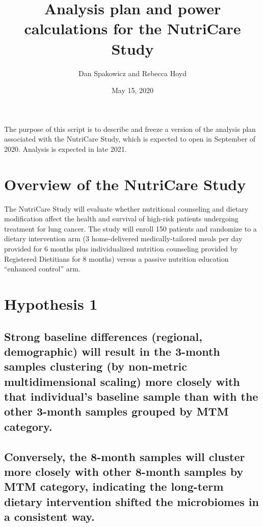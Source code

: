 \documentclass[]{article}
\title{Analysis plan and power calculations for the NutriCare Study}
\author{Dan Spakowicz and Rebecca Hoyd}
\date{May 15, 2020}
\begin{document}
\maketitle

The purpose of this script is to describe and freeze a version of the
analysis plan associated with the NutriCare Study, which is expected to
open in September of 2020. Analysis is expected in late 2021.

\hypertarget{overview-of-the-nutricare-study}{%
\section{Overview of the NutriCare
Study}\label{overview-of-the-nutricare-study}}

The NutriCare Study will evaluate whether nutritional counseling and
dietary modification affect the health and survival of high-risk
patients undergoing treatment for lung cancer. The study will enroll 150
patients and randomize to a dietary intervention arm (3 home-delivered
medically-tailored meals per day provided for 6 months plus
individualized nutrition counseling provided by Registered Dietitians
for 8 months) versus a passive nutrition education ``enhanced control''
arm.

\hypertarget{hypothesis-1}{%
\section{Hypothesis 1}\label{hypothesis-1}}

\hypertarget{strong-baseline-differences-regional-demographic-will-result-in-the-3-month-samples-clustering-by-non-metric-multidimensional-scaling-more-closely-with-that-individuals-baseline-sample-than-with-the-other-3-month-samples-grouped-by-mtm-category.}{%
\subsection{Strong baseline differences (regional, demographic) will
result in the 3-month samples clustering (by non-metric multidimensional
scaling) more closely with that individual's baseline sample than with
the other 3-month samples grouped by MTM
category.}\label{strong-baseline-differences-regional-demographic-will-result-in-the-3-month-samples-clustering-by-non-metric-multidimensional-scaling-more-closely-with-that-individuals-baseline-sample-than-with-the-other-3-month-samples-grouped-by-mtm-category.}}

\hypertarget{conversely-the-8-month-samples-will-cluster-more-closely-with-other-8-month-samples-by-mtm-category-indicating-the-long-term-dietary-intervention-shifted-the-microbiomes-in-a-consistent-way.}{%
\subsection{Conversely, the 8-month samples will cluster more closely
with other 8-month samples by MTM category, indicating the long-term
dietary intervention shifted the microbiomes in a consistent
way.}\label{conversely-the-8-month-samples-will-cluster-more-closely-with-other-8-month-samples-by-mtm-category-indicating-the-long-term-dietary-intervention-shifted-the-microbiomes-in-a-consistent-way.}}
\end{document}

